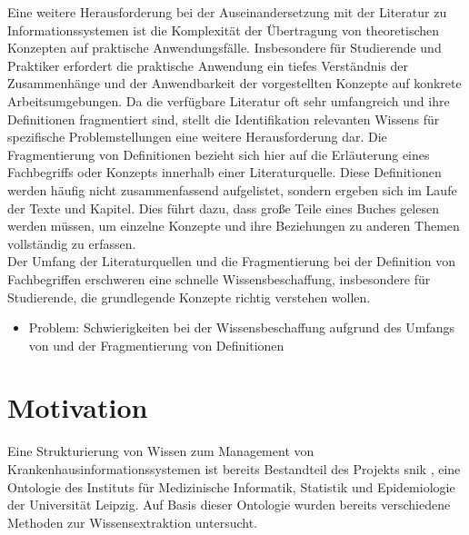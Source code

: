 Eine weitere Herausforderung bei der Auseinandersetzung mit der Literatur zu Informationssystemen ist die Komplexität der Übertragung von theoretischen Konzepten auf praktische Anwendungsfälle.
Insbesondere für Studierende und Praktiker erfordert die praktische Anwendung ein tiefes Verständnis der Zusammenhänge und der Anwendbarkeit der vorgestellten Konzepte auf konkrete Arbeitsumgebungen.
Da die verfügbare Literatur oft sehr umfangreich und ihre Definitionen fragmentiert sind, stellt die Identifikation relevanten Wissens für spezifische Problemstellungen eine weitere Herausforderung dar.
Die Fragmentierung von Definitionen bezieht sich hier auf die Erläuterung eines Fachbegriffs oder Konzepts innerhalb einer Literaturquelle.
Diese Definitionen werden häufig nicht zusammenfassend aufgelistet, sondern ergeben sich im Laufe der Texte und Kapitel.
Dies führt dazu, dass große Teile eines Buches gelesen werden müssen, um einzelne Konzepte und ihre Beziehungen zu anderen Themen vollständig zu erfassen.\\

Der Umfang der Literaturquellen und die Fragmentierung bei der Definition von Fachbegriffen
erschweren eine schnelle Wissensbeschaffung, insbesondere für Studierende, die grundlegende Konzepte richtig verstehen wollen.\\

\begin{itemize}
  \item Problem: Schwierigkeiten bei der Wissensbeschaffung aufgrund des Umfangs von \citet{bb} und der Fragmentierung von Definitionen
\end{itemize}

\section{Motivation}

Eine Strukturierung von Wissen zum Management von Krankenhausinformationssystemen ist bereits Bestandteil des Projekts \ac{snik} \citep{semantischesnetz, domaene},
eine Ontologie des Instituts für Medizinische Informatik, Statistik und Epidemiologie der Universität Leipzig.
Auf Basis dieser Ontologie wurden bereits verschiedene Methoden zur Wissensextraktion untersucht.\\

